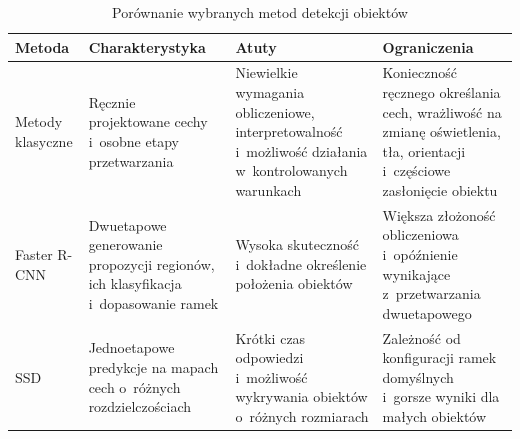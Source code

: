 \begin{table}[ht!]
    \centering
    \small
    \setlength{\tabcolsep}{4pt}
    \renewcommand{\arraystretch}{1.25}
    \caption{Porównanie wybranych metod detekcji obiektów}
    \label{tab:porownanie_metod_detekcji}
    \begin{tabularx}{\textwidth}{
        >{\raggedright\arraybackslash}p{1.8cm}
        >{\raggedright\arraybackslash}p{3.3cm}
        >{\raggedright\arraybackslash}X
        >{\raggedright\arraybackslash}X
        }
        \toprule
        \textbf{Metoda}                                                                                            &
        \textbf{Charakterystyka}                                                                                   &
        \textbf{Atuty}                                                                                             &
        \textbf{Ograniczenia}                                                                                                   \\
        \midrule

        Metody klasyczne                                                                                           &
        Ręcznie projektowane cechy i~osobne etapy przetwarzania                                                    &
        Niewielkie wymagania obliczeniowe, interpretowalność i~możliwość działania w~kontrolowanych warunkach      &
        Konieczność ręcznego określania cech, wrażliwość na zmianę oświetlenia, tła, orientacji i~częściowe zasłonięcie obiektu \\

        \addlinespace

        Faster R-CNN                                                                                               &
        Dwuetapowe generowanie propozycji regionów, ich klasyfikacja i~dopasowanie ramek                           &
        Wysoka skuteczność i~dokładne określenie położenia obiektów                                                &
        Większa złożoność obliczeniowa i~opóźnienie wynikające z~przetwarzania dwuetapowego                                     \\
        \addlinespace

        SSD                                                                                                        &
        Jednoetapowe predykcje na mapach cech o~różnych rozdzielczościach                                          &
        Krótki czas odpowiedzi i~możliwość wykrywania obiektów o~różnych rozmiarach                                &
        Zależność od konfiguracji ramek domyślnych i~gorsze wyniki dla małych obiektów                                          \\


\end{tabularx}
\end{table}
